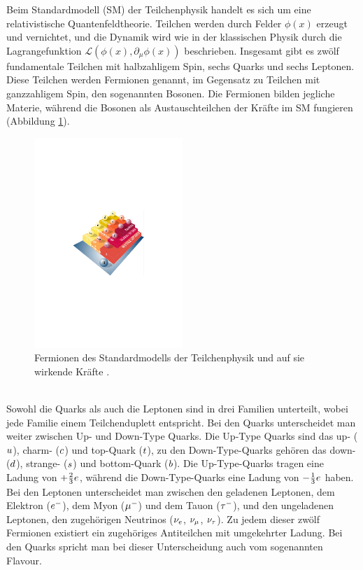 Beim Standardmodell (SM) der Teilchenphysik handelt es sich um eine relativistische Quantenfeldtheorie. Teilchen werden durch Felder $\phi(x)$ erzeugt und vernichtet, und die Dynamik wird wie in der klassischen Physik durch die Lagrangefunktion $\mathcal{L}(\phi(x),\partial_\mu\phi(x))$ beschrieben. Insgesamt gibt es zwölf fundamentale Teilchen mit halbzahligem Spin, sechs Quarks und sechs Leptonen. Diese Teilchen werden Fermionen genannt, im Gegensatz zu Teilchen mit ganzzahligem Spin, den sogenannten Bosonen. Die Fermionen bilden jegliche Materie, während die Bosonen als Austauschteilchen der Kräfte im SM fungieren (Abbildung \ref{fig:SM_teilchen}).
\begin{figure}[htbp]
	\centering
		\includegraphics[width=0.5\textwidth]{fig/SM_teilchen.pdf}
	\caption{Fermionen des Standardmodells der Teilchenphysik und auf sie wirkende Kräfte \cite{SM_teilchen}.}
	\label{fig:SM_teilchen} 
\end{figure}\\
Sowohl die Quarks als auch die Leptonen sind in drei Familien unterteilt, wobei jede Familie einem Teilchenduplett entspricht. Bei den Quarks unterscheidet man weiter zwischen Up- und  Down-Type Quarks. Die Up-Type Quarks sind das up- (${u}$), charm- (${c}$) und top-Quark (${t}$), zu den Down-Type-Quarks gehören das down- (${d}$), strange- (${s}$) und bottom-Quark (${b}$). Die Up-Type-Quarks tragen eine Ladung von $+\tfrac{2}{3}{e}$, während die Down-Type-Quarks eine Ladung von $-\tfrac{1}{3}{e}$ haben.\\
Bei den Leptonen unterscheidet man zwischen den geladenen Leptonen, dem Elektron (${e^-}$), dem Myon (${\mu^-}$) und dem Tauon (${\tau^-}$), und den ungeladenen Leptonen, den zugehörigen Neutrinos (${{\nu}_e}$, ${{\nu}_\mu}$, ${{\nu}_\tau}$). Zu jedem dieser zwölf Fermionen existiert ein zugehöriges Antiteilchen mit umgekehrter Ladung. Bei den Quarks spricht man bei dieser Unterscheidung auch vom sogenannten Flavour.\\
